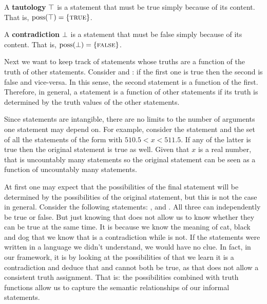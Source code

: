 \documentclass[11pt,letterpaper,fleqn]{memoir} %
\begin{document}
\begin{mathSection}
	\begin{defn}
		A \textbf{tautology} $\top$ is a statement that must be true simply because of its content. That is, $\operatorname{poss}(\top) = \{\textsc{true}\}$.
	\end{defn}
	
	\begin{defn}
		A \textbf{contradiction} $\bot$ is a statement that must be false simply because of its content. That is, $\operatorname{poss}(\bot) = \{\textsc{false}\}$.
	\end{defn}
	
\end{mathSection}

Next we want to keep track of statements whose truths are a function of the truth of other statements. Consider  and : if the first one is true then the second is false and vice-versa. In this sense, the second statement is a function of the first. Therefore, in general, a statement is a function of other statements if its truth is determined by the truth values of the other statements.

Since statements are intangible, there are no limits to the number of arguments one statement may depend on. For example, consider the statement  and the set of all the statements of the form  with $510.5 < x < 511.5$. If any of the latter is true then the original statement is true as well. Given that $x$ is a real number, that is uncountably many statements so the original statement can be seen as a function of uncountably many statements.

At first one may expect that the possibilities of the final statement will be determined by the possibilities of the original statement, but this is not the case in general. Consider the following statements: ,  and . All three can independently be true or false. But just knowing that does not allow us to know whether they can be true at the same time. It is because we know the meaning of cat, black and dog that we know that  is a contradiction while  is not. If the statements were written in a language we didn't understand, we would have no clue. In fact, in our framework, it is by looking at the possibilities of  that we learn it is a contradiction and deduce that  and  cannot both be true, as that does not allow a consistent truth assignment. That is: the possibilities combined with truth functions allow us to capture the semantic relationships of our informal statements.
\end{document}
